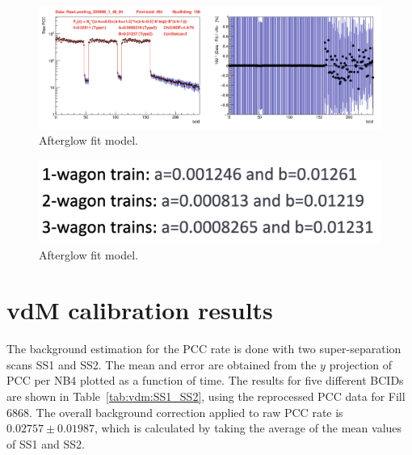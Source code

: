 \begin{figure}[!htp]
\centering
\includegraphics[width=1\textwidth]{ashish_thesis/3wagon_fit.png}
\caption[]{%
  Afterglow fit model.
}
\label{fig:af_fit}
\end{figure}




\begin{figure}[!htp]
\centering
\includegraphics[width=1\textwidth]{ashish_thesis/type2_af_parameters.png}
\caption[]{%
  Afterglow fit model.
}
\label{fig:af_fit}
\end{figure}




\section{vdM calibration results}

The background estimation for the PCC rate is done with two super-separation scans SS1 and SS2. The mean and error are obtained from the $y$ projection of PCC per NB4 plotted as a function of time. The results for five different BCIDs are shown in Table~\ref{tab:vdm:SS1_SS2}, using the reprocessed PCC data for Fill 6868. The overall background correction applied to raw PCC rate is $0.02757\pm0.01987$, which is calculated by taking the average of the mean values of SS1 and SS2.

